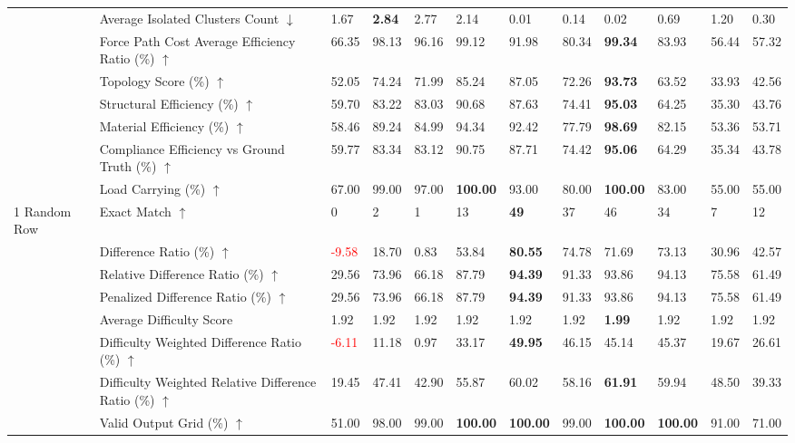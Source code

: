 \begin{table}[!h]
{\begin{tabular}{llllllllllll}
 & Average Isolated Clusters Count $\downarrow$ & 1.67 & \textbf{2.84} & 2.77 & 2.14 & 0.01 & 0.14 & 0.02 & 0.69 & 1.20 & 0.30 \\
 & Force Path Cost Average Efficiency Ratio (\%) $\uparrow$ & 66.35 & 98.13 & 96.16 & 99.12 & 91.98 & 80.34 & \textbf{99.34} & 83.93 & 56.44 & 57.32 \\
 & Topology Score (\%) $\uparrow$ & 52.05 & 74.24 & 71.99 & 85.24 & 87.05 & 72.26 & \textbf{93.73} & 63.52 & 33.93 & 42.56 \\
 & Structural Efficiency (\%) $\uparrow$ & 59.70 & 83.22 & 83.03 & 90.68 & 87.63 & 74.41 & \textbf{95.03} & 64.25 & 35.30 & 43.76 \\
 & Material Efficiency (\%) $\uparrow$ & 58.46 & 89.24 & 84.99 & 94.34 & 92.42 & 77.79 & \textbf{98.69} & 82.15 & 53.36 & 53.71 \\
 & Compliance Efficiency vs Ground Truth (\%) $\uparrow$ & 59.77 & 83.34 & 83.12 & 90.75 & 87.71 & 74.42 & \textbf{95.06} & 64.29 & 35.34 & 43.78 \\
 & Load Carrying (\%) $\uparrow$ & 67.00 & 99.00 & 97.00 & \textbf{100.00} & 93.00 & 80.00 & \textbf{100.00} & 83.00 & 55.00 & 55.00 \\
1 Random Row & Exact Match $\uparrow$ & 0 & 2 & 1 & 13 & \textbf{49} & 37 & 46 & 34 & 7 & 12 \\
 & Difference Ratio (\%) $\uparrow$ & \textcolor{red}{-9.58} & 18.70 & 0.83 & 53.84 & \textbf{80.55} & 74.78 & 71.69 & 73.13 & 30.96 & 42.57 \\
 & Relative Difference Ratio (\%) $\uparrow$ & 29.56 & 73.96 & 66.18 & 87.79 & \textbf{94.39} & 91.33 & 93.86 & 94.13 & 75.58 & 61.49 \\
 & Penalized Difference Ratio (\%) $\uparrow$ & 29.56 & 73.96 & 66.18 & 87.79 & \textbf{94.39} & 91.33 & 93.86 & 94.13 & 75.58 & 61.49 \\
 & Average Difficulty Score & 1.92 & 1.92 & 1.92 & 1.92 & 1.92 & 1.92 & \textbf{1.99} & 1.92 & 1.92 & 1.92 \\
 & Difficulty Weighted Difference Ratio (\%) $\uparrow$ & \textcolor{red}{-6.11} & 11.18 & 0.97 & 33.17 & \textbf{49.95} & 46.15 & 45.14 & 45.37 & 19.67 & 26.61 \\
 & Difficulty Weighted Relative Difference Ratio (\%) $\uparrow$ & 19.45 & 47.41 & 42.90 & 55.87 & 60.02 & 58.16 & \textbf{61.91} & 59.94 & 48.50 & 39.33 \\
 & Valid Output Grid (\%) $\uparrow$ & 51.00 & 98.00 & 99.00 & \textbf{100.00} & \textbf{100.00} & 99.00 & \textbf{100.00} & \textbf{100.00} & 91.00 & 71.00 \\

\end{tabular}}
\end{table}
